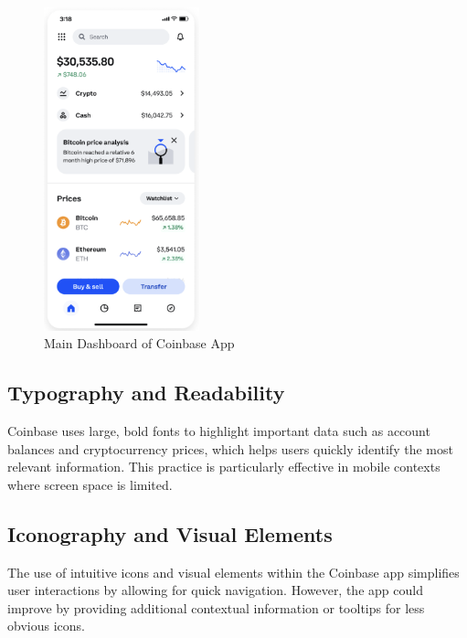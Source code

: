 \documentclass[12pt]{article}
\begin{document}
\begin{figure}[H]
    \centering
    \includegraphics[width=0.4\textwidth]{img/screenshot1.png}
    \caption{Main Dashboard of Coinbase App}
\end{figure}

\subsection{Typography and Readability}
Coinbase uses large, bold fonts to highlight important data such as account balances and cryptocurrency prices, which helps users quickly identify the most relevant information. This practice is particularly effective in mobile contexts where screen space is limited.

\subsection{Iconography and Visual Elements}
The use of intuitive icons and visual elements within the Coinbase app simplifies user interactions by allowing for quick navigation. However, the app could improve by providing additional contextual information or tooltips for less obvious icons.
\end{document}
